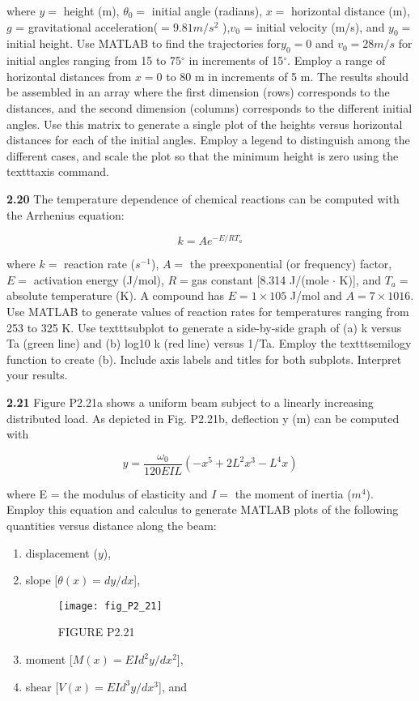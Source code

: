 \documentclass[../main.tex]{subfiles}
\begin{document}
\begin{multicols}{2}
where $y =$ height (m), $\theta_0 =$ initial angle (radians), $x =$
horizontal distance (m), $g$ = gravitational acceleration($= 9.81 m/s^2$
),$ v_0$ = initial velocity (m/s), and $y_0 =$ initial
height. Use MATLAB to find the trajectories for$ y_0 = 0$ and
$v_0 = 28 m/s$ for initial angles ranging from 15 to 75$^{\circ}$ in increments of 15$^{\circ}$. Employ a 
range of horizontal distances
from $x = 0$ to 80 m in increments of 5 m. The results should
be assembled in an array where the first dimension (rows)
corresponds to the distances, and the second dimension
(columns) corresponds to the different initial angles. Use
this matrix to generate a single plot of the heights versus
horizontal distances for each of the initial angles. Employ a
legend to distinguish among the different cases, and scale
the plot so that the minimum height is zero using the texttt{axis}
command.

\textbf{2.20} The temperature dependence of chemical reactions can
be computed with the Arrhenius equation:

$$k=Ae^{-E/RT_a}$$

where $k =$ reaction rate ($s^{-1}$), $A =$ the preexponential (or frequency) factor, 
$E =$ activation energy (J/mol), $R = $gas constant [8.314 J/(mole $\cdot$  K)], and $T_a =$ absolute temperature
(K). A compound has $E = 1 \times  105$ J/mol and $A = 7 \times 1016$.
Use MATLAB to generate values of reaction rates for
temperatures ranging from 253 to 325 K. Use texttt{subplot} to
generate a side-by-side graph of (a) k versus Ta (green line)
and (b) log10 k (red line) versus 1/Ta. Employ the texttt{semilogy}
function to create (b). Include axis labels and titles for both
subplots. Interpret your results.


\textbf{2.21} Figure P2.21a shows a uniform beam subject to a linearly increasing distributed load. As depicted in Fig. P2.21b,
deflection y (m) can be computed with

$$y=\dfrac{\omega_0}{120EIL}(-x^5+2L^2x^3-L^4x)$$

where E = the modulus of elasticity and $I =$ the moment of
inertia ($m^4$). Employ this equation and calculus to generate
MATLAB plots of the following quantities versus distance
along the beam:

\begin{enumerate}[label=(\alph*)]
	\item displacement ($y$), 
	\item slope [$\theta(x) = dy/dx$], 


\begin{figure}[H]
	\centering
	\texttt{[image: fig\_P2\_21]}
   \caption*{\textsf{FIGURE P2.21}}
   \label{fig_P2_6}
\end{figure}
\item moment [$M(x) = EId^2 y/dx^2$],
\item shear [$V(x) = EId^3 y/dx^3$], and


\end{enumerate}
\end{multicols}
\end{document}

